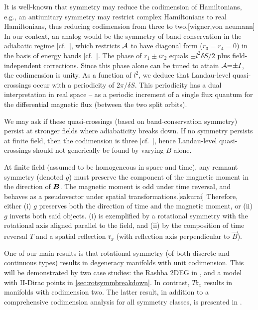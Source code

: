 \documentclass[aps, prb, showpacs, twocolumn, notitlepage, superscriptaddress]{revtex4-1}
\begin{document}

It is well-known that symmetry may reduce the codimension of Hamiltonians, e.g., an antiunitary symmetry may restrict complex Hamiltonians to real Hamiltonians, thus reducing codimension from three to two.[wigner,von neumann] In our context, an analog would be the symmetry of band conservation in the adiabatic regime [cf.\ ], which restricts ${\cal A}$ to have diagonal form  ($r_3{=}r_4{=}0$) in the basis of energy bands [cf.\ ]. The phase of $r_1{\pm}ir_2$ equals ${\pm} l^2\delta S/2$ plus field-independent corrections. Since this  phase alone  can be  tuned to attain ${\cal A}{=}{\pm}I$, the codimension is unity. As a function of $l^2$, we deduce that Landau-level quasi-crossings occur  with a periodicity of $2\pi/\delta S$. This periodicity  has a dual interpretation  in real space -- as a periodic increment of a single flux quantum for  the differential magnetic flux (between the two split orbits).


We may ask if these quasi-crossings (based on band-conservation symmetry) persist at stronger fields where adiabaticity breaks down. If no symmetry persists at finite field, then the codimension is three [cf.\ ], hence Landau-level quasi-crossings should not generically be found by varying $B$ alone.

At finite field (assumed to be homogeneous in space and time), any remnant  symmetry (denoted $g$) must preserve the component of the magnetic moment in the direction of  $\boldsymbol{B}$. The magnetic moment is odd under time reversal, and behaves as a pseudovector under spatial transformations.[sakurai] Therefore, either (i) $g$  preserves both the direction of time and the magnetic moment, or (ii) $g$ inverts both said objects. (i) is exemplified by a rotational symmetry with the rotational axis aligned parallel to the field, and (ii) by the composition  of time reversal $T$ and a spatial reflection $\mathfrak{r}_x$ (with reflection axis perpendicular to $\vec{B}$). 

One of our main results is that  rotational symmetry (of both discrete and continuous types) results in degeneracy manifolds with unit codimension. This will be demonstrated by two  case studies: the Rashba 2DEG in , and a model with II-Dirac points in \ref{sec:rotsymmbreakdown}. In contrast,  $T\mathfrak{r}_x$ results in manifolds with codimension two. The latter result, in addition to a comprehensive codimension analysis for all symmetry classes, is presented in . 
\end{document}
